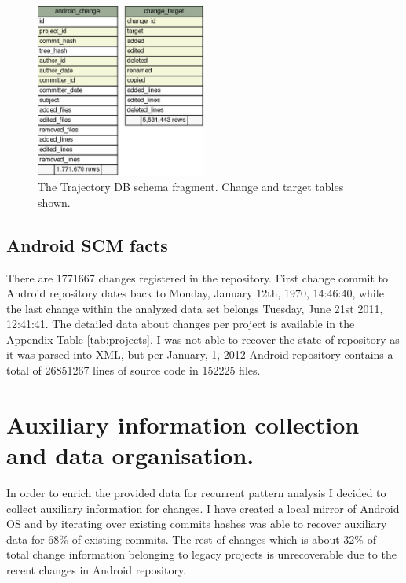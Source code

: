 \documentclass[a4paper,10pt]{article}
\numberwithin{equation}{subsection}
\begin{document}
\begin{figure}
   \begin{center}
   \includegraphics[scale=0.4,width=0.5\textwidth]{figures/schema-change-fragment.png}
   \end{center}
   \caption{The Trajectory DB schema fragment. Change and target tables shown.}
   \label{fig:schema_change_fragment}
\end{figure}


\subsection{Android SCM facts}
There are 1771667 changes registered in the repository. First change commit to Android repository dates back 
to Monday, January 12th, 1970, 14:46:40, while the last change within the analyzed data set belongs Tuesday, 
June 21st 2011, 12:41:41. The detailed data about changes per project is available in the Appendix Table 
\ref{tab:projects}. I was not able to recover the state of repository as it was parsed into XML, but 
per January, 1, 2012 Android repository contains a total of 26851267 lines of source code in 152225 files. 

\section{Auxiliary information collection and data organisation.}
In order to enrich the provided data for recurrent pattern analysis I decided to collect auxiliary 
information for changes. I have created a local mirror of Android OS and by iterating over existing 
commits hashes was able to recover auxiliary data for 68\% of existing commits. The rest 
of changes which is about 32\% of total change information belonging to legacy projects is 
unrecoverable due to the recent changes in Android repository. 
\end{document}
